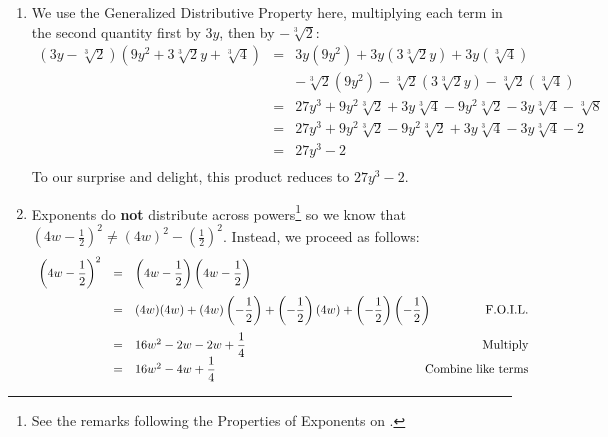 \begin{ex}
\begin{enumerate}
\item  We use the Generalized Distributive Property here, multiplying each term in the second quantity first by $3y$, then by $-\sqrt[3]{2}$:\[ \begin{array}{rclr}

\left(3y - \sqrt[3]{2}\right)\left(9y^2 + 3\sqrt[3]{2} y + \sqrt[3]{4}\right) & = & 3y\left(9y^2\right) +3y\left(3\sqrt[3]{2} y\right) + 3y\left(\sqrt[3]{4}\right) & \\
       & & -\sqrt[3]{2} \left(9y^2\right) - \sqrt[3]{2} \left(3\sqrt[3]{2} y\right) -\sqrt[3]{2} \left(\sqrt[3]{4}\right) & \\
			  & = & 27y^3 + 9y^2 \sqrt[3]{2} + 3y \sqrt[3]{4} - 9y^2\sqrt[3]{2} - 3y \sqrt[3]{4} - \sqrt[3]{8} & \\
				& = & 27y^3 + 9y^2 \sqrt[3]{2} - 9y^2 \sqrt[3]{2} + 3y \sqrt[3]{4} - 3y \sqrt[3]{4} - 2 & \\
				& = & 27y^3 - 2 \\ 

\end{array} \] To our surprise and delight, this product reduces to $27y^3 - 2$.

\item Exponents do \textbf{not} distribute across powers\footnote{See the remarks following the Properties of Exponents on \pageref{propertiesofintegerexponents}.} so we know that  $\left(4w - \frac{1}{2} \right)^2 \neq (4w)^2 - \left(\frac{1}{2}\right)^2$.  Instead, we proceed as follows:\[ \begin{array}{rclr}

\left(4w - \dfrac{1}{2} \right)^2 & = & \left(4w - \dfrac{1}{2} \right)\left(4w - \dfrac{1}{2} \right) & \hspace*{-.2in} \\[12pt]
                                 & = & (4w)(4w) + (4w)\left(-\dfrac{1}{2}\right) + \left(-\dfrac{1}{2}\right)(4w) + \left(-\dfrac{1}{2}\right)\left(-\dfrac{1}{2}\right) & \hspace*{-.2in} \text{F.O.I.L.} \\[12pt]
																
																& = & 16w^2 - 2w - 2w + \dfrac{1}{4} & \hspace*{-.2in} \text{Multiply} \\ 
                                & = & 16w^2 - 4w + \dfrac{1}{4} & \hspace*{-.2in} \text{Combine like terms} \\ 
\end{array}\]


\end{enumerate}
\end{ex}
